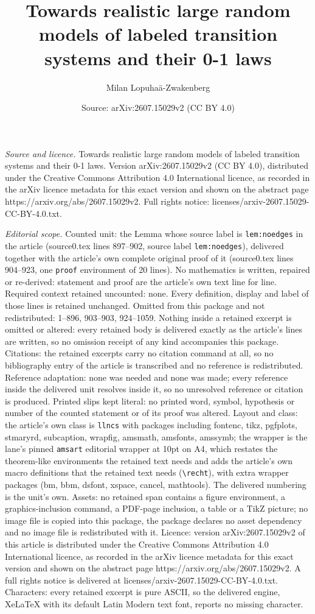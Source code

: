 \documentclass[10pt,a4paper]{amsart}
\title[Towards realistic large random models of labeled transition ]{Towards realistic large random models of labeled transition systems and their 0-1 laws}
\author{Milan Lopuha\"a-Zwakenberg}
\date{Source: arXiv:2607.15029v2 (CC BY 4.0)}
\begin{document}
\maketitle

\noindent\emph{Source and licence.} Towards realistic large random models of labeled transition systems and their 0-1 laws. Version arXiv:2607.15029v2 (CC BY 4.0), distributed under the Creative Commons Attribution 4.0 International licence, as recorded in the arXiv licence metadata for this exact version and shown on the abstract page https://arxiv.org/abs/2607.15029v2. Full rights notice: licenses/arxiv-2607.15029-CC-BY-4.0.txt.\par\smallskip

\noindent\textit{Editorial scope.} Counted unit: the Lemma whose source label is \texttt{lem:noedges} in the article (source0.tex lines 897--902, source label \texttt{lem:noedges}), delivered together with the article's own complete original proof of it (source0.tex lines 904--923, one \texttt{proof} environment of 20 lines). No mathematics is written, repaired or re-derived: statement and proof are the article's own text line for line. Required context retained uncounted: none. Every definition, display and label of those lines is retained unchanged. Omitted from this package and not redistributed: 1--896, 903--903, 924--1059. Nothing inside a retained excerpt is omitted or altered: every retained body is delivered exactly as the article's lines are written, so no omission receipt of any kind accompanies this package. Citations: the retained excerpts carry no citation command at all, so no bibliography entry of the article is transcribed and no reference is redistributed. Reference adaptation: none was needed and none was made; every reference inside the delivered unit resolves inside it, so no unresolved reference or citation is produced. Printed slips kept literal: no printed word, symbol, hypothesis or number of the counted statement or of its proof was altered. Layout and class: the article's own class is \texttt{llncs} with packages including fontenc, tikz, pgfplots, stmaryrd, subcaption, wrapfig, amsmath, amsfonts, amssymb; the wrapper is the lane's pinned \texttt{amsart} editorial wrapper at 10pt on A4, which restates the theorem-like environments the retained text needs and adds the article's own macro definitions that the retained text needs (\texttt{\textbackslash recht}), with extra wrapper packages (bm, bbm, dsfont, xspace, cancel, mathtools). The delivered numbering is the unit's own. Assets: no retained span contains a figure environment, a graphics-inclusion command, a PDF-page inclusion, a table or a TikZ picture; no image file is copied into this package, the package declares no asset dependency and no image file is redistributed with it. Licence: version arXiv:2607.15029v2 of this article is distributed under the Creative Commons Attribution 4.0 International licence, as recorded in the arXiv licence metadata for this exact version and shown on the abstract page https://arxiv.org/abs/2607.15029v2. A full rights notice is delivered at licenses/arxiv-2607.15029-CC-BY-4.0.txt. Characters: every retained excerpt is pure ASCII, so the delivered engine, XeLaTeX with its default Latin Modern text font, reports no missing character.
\end{document}
